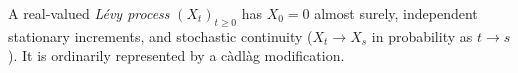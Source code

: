 
A real-valued \emph{Lévy process} $(X_t)_{t\ge0}$ has $X_0=0$ almost surely, independent stationary increments, and stochastic continuity ($X_t\to X_s$ in probability as $t\to s$). It is ordinarily represented by a càdlàg modification.
